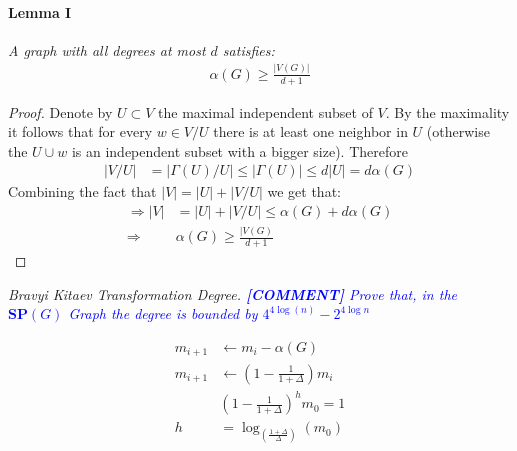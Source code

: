 \documentclass{article}
\newcommand{\commentt}[1]{\textcolor{blue}{ \textbf{[COMMENT]} #1}}
\newcommand{\ctt}[1]{\commentt{#1}}
\begin{document}
      \paragraph{Lemma I} \textit{ A graph with all degrees at most \(d\) satisfies: 
	\begin{equation*}
	  \begin{split}
	    \alpha \left( G\right) \ge \frac{|V\left(G\right)|}{d+1}
	  \end{split}
	\end{equation*}
      }
      \begin{proof} Denote by \(U \subset V\) the maximal independent subset of \(V\). By the maximality it follows that for every \(w \in V/U \) there is at least one neighbor in \(U\) (otherwise the \(U \cup w\) is an independent subset with a bigger size). Therefore 
	\begin{equation*}
	  \begin{split}
	    |V/U| &= |\Gamma\left(U\right) / U | \le |\Gamma\left(U\right)| \le d |U|= d \alpha \left( G\right) 
	  \end{split}
	\end{equation*}
	Combining the fact that \(|V| = |U| + |V/U| \) we get that: 
	\begin{equation*}
	  \begin{split}
	    \Rightarrow |V| &= |U| + |V/U| \le \alpha \left( G\right)  + d \alpha \left( G\right) \\
	    \Rightarrow \  & \alpha \left( G\right) \ge \frac{|V\left(G\right)}{d+1} 
	  \end{split}
	\end{equation*}
      \end{proof}

      \begin{lemma} \textit{Bravyi Kitaev Transformation Degree. \ctt{Prove that, in the \(\textbf{SP}(G)\) Graph the degree is bounded by \(4^{4\log(n)} - 2^{4\log{n}}\) }}
      \end{lemma}
      \begin{equation*}
	\begin{split}
	  m_{i+1} & \leftarrow m_{i} - \alpha\left(G\right) \\ 
	  m_{i+1} & \leftarrow \left( 1  - \frac{1}{1 + \Delta} \right)m_{i} \\ 
	  & \left( 1  - \frac{1}{1 + \Delta} \right)^{h} m_{0} = 1 \\
	  h &= \log_{\left( \frac{1 + \Delta}{\Delta} \right)}{\left( m_{0} \right)}
	\end{split}
      \end{equation*}
\end{document}

